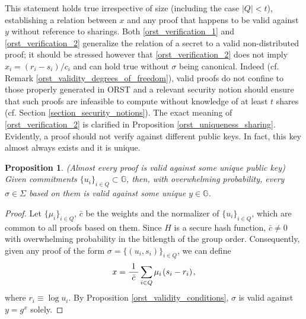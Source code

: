 \documentclass[10pt, psamsfonts, reqno]{amsart}
\newtheorem{prop}[thm]{Proposition}
\theoremstyle{definition}
\theoremstyle{remark}
\numberwithin{equation}{section}
\begin{document}
\noindent
This statement holds true irrespective of size
(including the case $|Q| < t$),
establishing a relation between $x$ and any proof
that happens to be valid against $y$
without reference to sharings.
Both \eqref{orst_verification_1} and \eqref{orst_verification_2}
generalize the relation of a secret to a
valid non-distributed proof;
it should be stressed however that
\eqref{orst_verification_2} does not imply
$x_i = (r_i - s_i)/c_i$ and
can hold true without $\sigma$ being canonical.
Indeed (cf. Remark \ref{orst_validity_degrees_of_freedom}),
valid proofs do not confine to those properly
generated in \textsf{ORST} and a relevant security notion
should ensure that such proofs are infeasible to compute
without knowledge of at least $t$ shares
(cf. Section \ref{section_security_notions}).
The exact meaning of \eqref{orst_verification_2}
is clarified in Proposition \ref{orst_uniqueness_sharing}.
Evidently, a proof should not verify against
different public keys.
In fact, this key almost always exists and it is unique.

\begin{prop}\label{orst_uniqueness_public_key}
\textup{(\textit{Almost every proof is valid against
some unique public key})}
Given commitments $\{u_i\}_{i \in Q} \subset \mathbb{G}$,
then, with overwhelming probability,
every $\sigma \in \Sigma$ based on them
is valid against some unique $y \in \mathbb{G}$.
\end{prop}

\begin{proof}
Let $\{\mu_i\}_{i \in Q}$, $\bar{c}$
be the weights and the normalizer of $\{u_i\}_{i \in Q}$,
which are common to all proofs based on them.
Since $H$ is a secure hash function,
$\bar{c} \neq 0$ with overwhelming probability in
the bitlength of the group order.
Consequently, given any proof of the form
$\sigma = \{(u_i, s_i)\}_{i \in Q}$, we can define
\vspace{5pt}
\begin{equation*}
x = \frac{1}{\ \bar{c}\ }
\sum_{i \in Q} \mu_i\hspace{1pt}(s_i - r_i)\hspace{1pt},
\vspace{5pt}
\end{equation*}
where $r_i \equiv \log u_i$.
By Proposition \ref{orst_validity_conditions},
$\sigma$ is valid against $y = g ^ x$ solely.
\vspace{5pt}
\end{proof}
\end{document}
